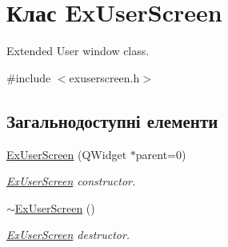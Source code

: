 \hypertarget{classExUserScreen}{\section{Клас Ex\-User\-Screen}
\label{classExUserScreen}
}


Extended User window class.  




{\ttfamily \#include $<$exuserscreen.\-h$>$}

\subsection*{Загальнодоступні елементи}
\begin{DoxyCompactItemize}
\item 
\hyperlink{classExUserScreen_a8642db4f09c4528daf7e22ce2dcc1b47}{Ex\-User\-Screen} (Q\-Widget $\ast$parent=0)
\begin{DoxyCompactList}\small\item\em \hyperlink{classExUserScreen}{Ex\-User\-Screen} constructor. \end{DoxyCompactList}\item 
\hypertarget{classExUserScreen_a61421cd56bb9b54501c4cb34d297891f}{\hyperlink{classExUserScreen_a61421cd56bb9b54501c4cb34d297891f}{$\sim$\-Ex\-User\-Screen} ()}\label{classExUserScreen_a61421cd56bb9b54501c4cb34d297891f}

\begin{DoxyCompactList}\small\item\em \hyperlink{classExUserScreen}{Ex\-User\-Screen} destructor. \end{DoxyCompactList}\end{DoxyCompactItemize}
